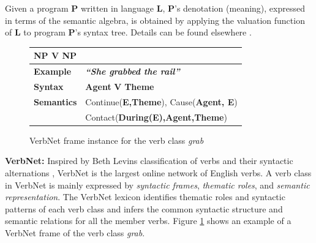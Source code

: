 \documentclass[letterpaper]{article}
\begin{document}
\noindent Given a program \textbf{P} written in language \textbf{L}, \textbf{P}'s denotation (meaning), expressed in terms of the semantic algebra, is obtained by applying the valuation function of \textbf{L} to program \textbf{P}'s syntax tree. Details can be found elsewhere \cite{d_semantics}.   

\begin{figure}[t]
\tiny
\centering
\begin{tabular}{|p{1.2cm}|p{6cm}|}
    \hline
     \multicolumn{2}{|l|}{\textbf{NP V NP}}   \\
    \hline
    \textbf{Example}  & \textbf{\textit{``She grabbed the rail''}} \\
    \hline 
    \textbf{Syntax}  & \textbf{Agent} \textbf{V} \textbf{Theme}  \\
    \hline  
    \textbf{Semantics}  & \textcolor{burgundy}{Continue(}\textbf{E,Theme}\textcolor{burgundy}{)}, \textcolor{burgundy}{Cause(}\textbf{Agent, E}\textcolor{burgundy}{)}\\ 
    & \textcolor{burgundy}{Contact(}\textbf{During(E),Agent,Theme}\textcolor{burgundy}{)} \\
    \hline
\end{tabular}
\caption{VerbNet frame instance for the verb class \textit{grab}} 
    \label{fig:verbnet-example}
\end{figure}

\medskip 

\noindent\textbf{VerbNet:} 
Inspired by Beth Levins classification of verbs and their syntactic alternations \cite{verbclasses}, VerbNet \cite{vn} is the largest online network of English verbs. A verb class in VerbNet is mainly expressed by \textit{syntactic frames}, \textit{thematic roles},  and  \textit{semantic representation}. The VerbNet
lexicon identifies  thematic roles and  syntactic patterns of each verb class and infers the common syntactic structure and semantic relations for all the member verbs. Figure \ref{fig:verbnet-example} shows an example of a VerbNet frame of the verb class \textit{grab}. 

\end{document}
